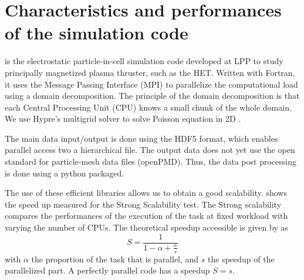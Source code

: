 

\section*{Characteristics and performances of the  \LPPic simulation code }
\label{sec-lppic}


\LPPic is the electrostatic particle-in-cell simulation code developed at \ac{LPP} to study principally magnetized plasma thruster, such as the \ac{HET}.
Written with Fortran, it uses the Message Passing Interface (MPI) to parallelize the computational load using a domain decomposition.
The principle of the domain decomposition is that each Central Processing Unit (CPU) knows a small chunk of the whole domain.
We use {\sc Hypre}'s multigrid solver to solve Poisson equation in \ac{2D} \citep{falgout2002}.

The main data input/output is done using the HDF5 format, which enables parallel access two a hierarchical file.
The output data does not yet use the open standard for particle-mesh data files (openPMD).
Thus, the data post processing is done using a python packaged.

The use of these efficient libraries allows us to obtain a good scalability.
 shows the speed up measured for the Strong Scalability test.
The Strong scalability compares the performances of the execution of the task at fixed workload with varying the number of CPUs.
The theoretical speedup accessible is given by \citet{amdahl1967} as
\begin{equation} \label{eq-amdahl}
  S = \frac{1}{1 - \alpha + \frac{\alpha}{s}}
\end{equation}
with $\alpha$ the proportion of the task that is parallel, and $s$ the speedup of the parallelized part.
A perfectly parallel code has a speedup $S=s$.

